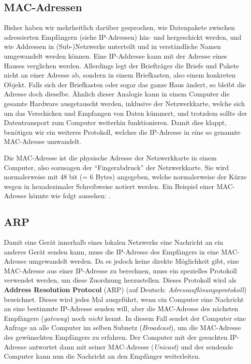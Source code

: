 \subsection{MAC-Adressen}
Bisher haben wir mehrheitlich darüber gesprochen, wie Datenpakete zwischen adressierten Empfängern (siehe \gls{IP}-Adressen) hin- und hergeschickt werden, und wie Addressen in (Sub-)Netzwerke unterteilt und in verständliche Namen umgewandelt werden können. Eine \gls{IP}-Addresse kann mit der Adresse eines Hauses verglichen werden. Allerdings legt der Briefträger die Briefe und Pakete nicht an einer Adresse ab, sondern in einem Briefkasten, also einem konkreten Objekt. Falls sich der Briefkasten oder sogar das ganze Haus ändert, so bleibt die Adresse doch dieselbe. Ähnlich dieser Analogie kann in einem Computer die gesamte Hardware ausgetauscht werden, inklusive der Netzwerkkarte, welche sich um das Verschicken und Empfangen von Daten kümmert, und trotzdem sollte der Datentransport zum Computer weiterhin funktionieren. Damit dies klappt, benötigen wir ein weiteres Protokoll, welches die \gls{IP}-Adresse in eine so genannte \gls{MAC}-Adresse umwandelt.

\begin{mydefinition}
Die \gls{MAC}-Adresse ist die physische Adresse der Netzwerkkarte in einem Computer, also sozusagen der \enquote{Fingerabdruck} der Netzwerkkarte. Sie wird normalerweise mit 48 bit (= 6 Bytes) angegeben, welche normalerweise der Kürze wegen in hexadezimaler Schreibweise notiert werden. Ein Beispiel einer \gls{MAC}-Adresse könnte wie folgt aussehen: .
\end{mydefinition}

\subsection{\texorpdfstring{\gls{ARP}}{ARP}}
Damit eine Gerät innerhalb eines lokalen Netzwerks eine Nachricht an ein anderes Gerät senden kann, muss die \gls{IP}-Adresse des Empfängers in eine \gls{MAC}-Adresse umgewandelt werden. Da es jedoch keine direkte Möglichkeit gibt, eine \gls{MAC}-Adresse aus einer \gls{IP}-Adresse zu berechnen, muss ein spezielles Protokoll verwendet werden, um diese Zuordnung herzustellen. Dieses Protokoll wird als \textbf{Address Resolution Protocol} (\gls{ARP})  (auf Deutsch: \textit{Adressauflösungsprotokoll})  bezeichnet. Dieses wird jedes Mal ausgeführt, wenn ein Computer eine Nachricht an eine bestimmte \gls{IP}-Adresse senden will, aber die \gls{MAC}-Adresse des nächsten Empfängers (\textit{gateway})  noch  \textit{nicht} kennt. In diesem Fall sendet der Computer eine Anfrage an alle Computer im selben Subnetz (\textit{Broadcast}), um die \gls{MAC}-Adresse des gewünschten Empfängers zu erfahren. Der Computer mit der gesuchten \gls{IP}-Adresse antwortet dann mit seiner \gls{MAC}-Adresse (\textit{Unicast}) und der sendende Computer kann nun die Nachricht an den Empfänger weiterleiten.

